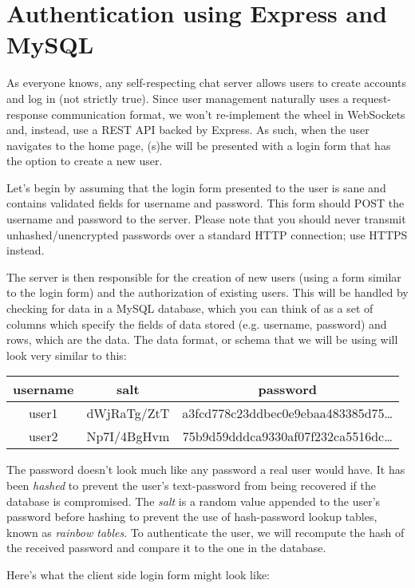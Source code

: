\documentclass[12pt]{article}
\begin{document}
\section{Authentication using Express and MySQL}
As everyone knows, any self-respecting chat server allows users to create accounts and log in (not strictly true). Since user management naturally uses a request-response communication format, we won't re-implement the wheel in WebSockets and, instead, use a REST API backed by Express. As such, when the user navigates to the home page, (s)he will be presented with a login form that has the option to create a new user.
\par
Let's begin by assuming that the login form presented to the user is sane and contains validated fields for username and password. This form should POST the username and password to the server. Please note that you should never transmit unhashed/unencrypted passwords over a standard HTTP connection; use HTTPS instead.
\par
The server is then responsible for the creation of new users (using a form similar to the login form) and the authorization of existing users. This will be handled by checking for data in a MySQL database, which you can think of as a set of columns which specify the fields of data stored (e.g. username, password) and rows, which are the data. The data format, or schema that we will be using will look very similar to this:
\begin{center}
  \begin{tabular}{| c | c | c |}
    \hline
    \textbf{username} & \textbf{salt} & \textbf{password} \\
    \hline
    user1 & dWjRaTg/ZtT & a3fcd778c23ddbec0e9ebaa483385d75\ldots \\
    \hline
    user2 & Np7I/4BgHvm & 75b9d59dddca9330af07f232ca5516dc\ldots\\
    \hline
  \end{tabular}
\end{center}
The password doesn't look much like any password a real user would have. It has been \emph{hashed} to prevent the user's text-password from being recovered if the database is compromised. The \emph{salt} is a random value appended to the user's password before hashing to prevent the use of hash-password lookup tables, known as \emph{rainbow tables}. To authenticate the user, we will recompute the hash of the received password and compare it to the one in the database.
\par
Here's what the client side login form might look like:
\end{document}
